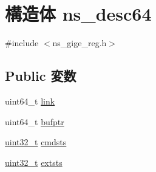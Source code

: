 \hypertarget{structns__desc64}{
\section{構造体 ns\_\-desc64}
\label{structns__desc64}
}


{\ttfamily \#include $<$ns\_\-gige\_\-reg.h$>$}\subsection*{Public 変数}
\begin{DoxyCompactItemize}
\item 
uint64\_\-t \hyperlink{structns__desc64_a4aaf43c9fa9d5efdd466a4ab4a50de75}{link}
\item 
uint64\_\-t \hyperlink{structns__desc64_a4cc37142919fe863bc2b5959baba2b4f}{bufptr}
\item 
\hyperlink{Type_8hh_a435d1572bf3f880d55459d9805097f62}{uint32\_\-t} \hyperlink{structns__desc64_a7484a3aa644dde4355c24a2c6365715d}{cmdsts}
\item 
\hyperlink{Type_8hh_a435d1572bf3f880d55459d9805097f62}{uint32\_\-t} \hyperlink{structns__desc64_ad874b18768bd13482acfbe2b4825996a}{extsts}
\end{DoxyCompactItemize}


